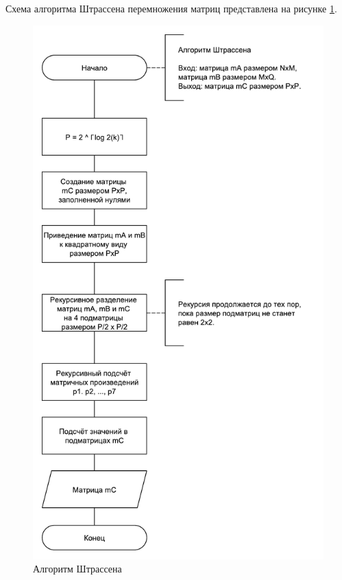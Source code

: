 Схема алгоритма Штрассена перемножения матриц представлена на рисунке \ref{fig:strassen}.

\begin{figure}
	\centering
	\includegraphics[width=0.65\linewidth]{images/strassen}
	\caption{Алгоритм Штрассена}
	\label{fig:strassen}
\end{figure}

\newpage

